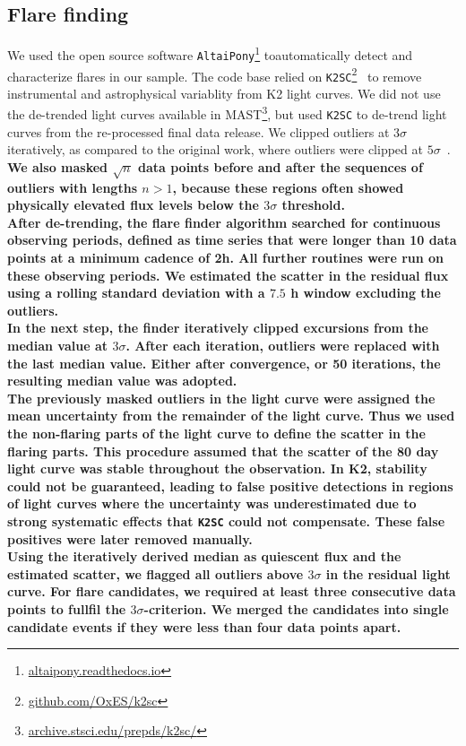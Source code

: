\documentclass{aa}
\begin{document}
\subsection{Flare finding}
\label{sec:sec:flarefinding}
We used the open source software \texttt{AltaiPony}\footnote{\url{altaipony.readthedocs.io}} toautomatically detect and characterize flares in our sample. The code base relied on \texttt{K2SC}\footnote{\url{github.com/OxES/k2sc}}~\citep{aigrain_k2sc_2016} to remove instrumental and astrophysical variablity from K2 light curves. We did not use the de-trended light curves available in MAST\footnote{\url{archive.stsci.edu/prepds/k2sc/}}, but used \texttt{K2SC} to de-trend light curves from the re-processed final data release. We clipped outliers at $3\sigma$ iteratively, as compared to the original work, where outliers were clipped at $5\sigma$~\citep{aigrain_k2sc_2016}.\textbf{ We also masked $\sqrt{n}$ data points before and after the sequences of outliers with lengths $n>1$, because these regions often showed physically elevated flux levels below the $3\sigma$ threshold.
\\
After de-trending, the flare finder algorithm searched for continuous observing periods, defined as time series that were longer than 10 data points at a minimum cadence of 2\;h. All further routines were run on these observing periods. We estimated the scatter in the residual flux using a rolling standard deviation with a $7.5$ h window excluding the outliers. 
\\
In the next step, the finder iteratively clipped excursions from the median value at $3\sigma$. After each iteration, outliers were replaced with the last median value. Either after convergence, or 50 iterations, the resulting median value was adopted. 
\\
The previously masked outliers in the light curve were assigned the mean uncertainty from the remainder of the light curve. Thus we used the non-flaring parts of the light curve to define the scatter in the flaring parts. This procedure assumed that the scatter of the 80 day light curve was stable throughout the observation. In K2, stability could not be guaranteed, leading to false positive detections in regions of light curves where the uncertainty was underestimated due to strong systematic effects that \texttt{K2SC} could not compensate. These false positives were later removed manually. 
\\
Using the iteratively derived median as quiescent flux and the estimated scatter, we flagged all outliers above $3\sigma$ in the residual light curve. For flare candidates, we required at least three consecutive data points to fullfil the $3\sigma$-criterion. We merged the candidates into single candidate events if they were less than four data points apart. }
\end{document}
